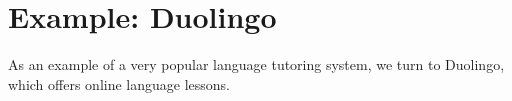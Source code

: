 









\section{Example: Duolingo}

As an example of a very popular language tutoring system, we turn to Duolingo, which offers online language lessons.

